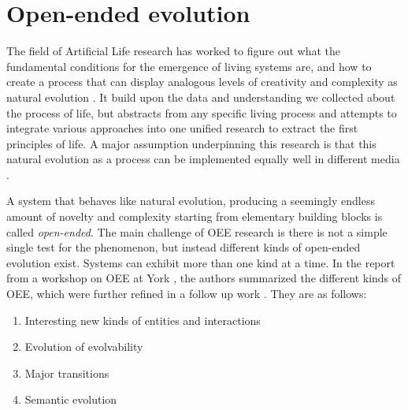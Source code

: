 \section{Open-ended evolution\label{sec:open-ended-evolution-1}}
The field of Artificial Life research has worked to figure out what the
fundamental conditions for the emergence of living systems are, and how to
create a process that can display analogous levels of creativity and complexity
as natural evolution \parencite{eigenHypercycle1979,
  langtonArtificialLifeProceedings1989, dysonOriginsLife1999,
  stanleyWhyOpenEndednessMatters2019, packardOverviewOpenEndedEvolution2019,
  sorosOpenendednessLastGrand2017}. It build upon the data and understanding we
collected about the process of life, but abstracts from any specific living
process and attempts to integrate various approaches into one unified research
to extract the first principles of life. A major assumption underpinning this
research is that this natural evolution as a process can be implemented equally
well in different media \parencite{dennettDarwinDangerousIdea1996}.

A system that behaves like natural evolution, producing a seemingly endless
amount of novelty and complexity starting from elementary building blocks is
called \emph{open-ended}. The main challenge of \ac{OEE} research is there is
not a simple single test for the phenomenon, but instead different kinds of
open-ended evolution exist. Systems can exhibit more than one kind at a time. In
the report from a workshop on \ac{OEE} at York
\parencite{taylorOpenEndedEvolutionPerspectives2016}, the authors summarized the
different kinds of \ac{OEE}, which were further refined in a follow up work
\parencite{packardOverviewOpenEndedEvolution2019}. They are as follows:

\begin{enumerate}
  \item Interesting new kinds of entities and interactions
  \item Evolution of evolvability
  \item Major transitions
  \item Semantic evolution
\end{enumerate}

